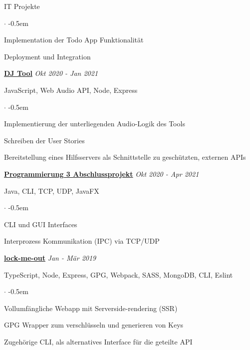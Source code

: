 \documentclass{cv}
\begin{document}
\begin{rSection}{IT Projekte}
  \begin{list}{$\cdot$}{}
    \itemsep -0.5em \vspace{-0.5em} %
    \smallskip
    \item Implementation der Todo App Funktionalität
    \item Deployment und Integration
  \end{list}

  \textbf{\href{https://github.com/vyvytn/avt}{DJ Tool}}
  \hfill
  {\em Okt 2020 - Jan 2021}

  JavaScript, Web Audio API, Node, Express
  \begin{list}{$\cdot$}{}
    \itemsep -0.5em \vspace{-0.5em}
    \smallskip
    \item Implementierung der unterliegenden Audio-Logik des Tools
    \item Schreiben der User Stories
    \item Bereitstellung eines Hilfsservers als Schnittstelle zu geschützten, externen APIs
  \end{list}

  \textbf{\href{https://github.com/jneidel/htw-prog3}{Programmierung 3 Abschlussprojekt}}
  \hfill
  {\em Okt 2020 - Apr 2021}

  Java, CLI, TCP, UDP, JavaFX
  \begin{list}{$\cdot$}{}
    \itemsep -0.5em \vspace{-0.5em}
    \smallskip
    \item CLI und GUI Interfaces
    \item Interprozess Kommunikation (IPC) via TCP/UDP
  \end{list}

  \textbf{\href{https://github.com/jneidel/lock-me-out}{lock-me-out}}
  \hfill
  {\em Jan - Mär 2019}

  TypeScript, Node, Express, GPG, Webpack, SASS, MongoDB, CLI, Eslint
  \begin{list}{$\cdot$}{}
    \itemsep -0.5em \vspace{-0.5em}
    \smallskip
    \item Vollumfängliche Webapp mit Serverside-rendering (SSR)
    \item GPG Wrapper zum verschlüsseln und generieren von Keys
    \item Zugehörige CLI, als alternatives Interface für die geteilte API
  \end{list}


\end{rSection}
\end{document}
